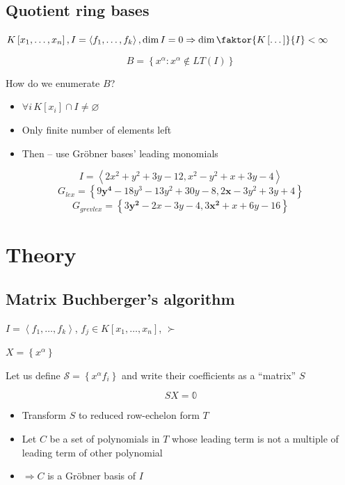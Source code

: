 \subsection{Quotient ring bases}
\begin{frame}
    $K\left[x_1,\dots,x_n\right], I=\left\langle f_1, \dots, f_k\right\rangle, \dim I = 0 \Rightarrow \dim \faktor{K\left[\dots\right]}{I} < \infty$


    $$B=\left\{x^\alpha: x^\alpha\not\in LT\left(I\right)\right\}$$
    
    How do we enumerate $B$?

    \begin{itemize}
        \item $\forall i\, K\left[x_i\right]\cap I \neq \varnothing$
        \item Only finite number of elements left
        \item Then -- use Gr\"obner bases' leading monomials
    \end{itemize}
   
    \pause
    $$I=\left\langle 2x^2+y^2+3y-12, x^2-y^2+x+3y-4\right\rangle$$
    \pause
    $$G_{lex}=\left\{9\mathbf{y^4}-18y^3-13y^2+30y-8, 2\mathbf{x}-3y^2+3y+4\right\}$$
    \pause
    $$G_{grevlex}=\left\{3\mathbf{y^2}-2x-3y-4, 3\mathbf{x^2}+x+6y-16\right\}$$
\end{frame}

\section{Theory}
\subsection{Matrix Buchberger's algorithm}
\begin{frame}
    $I=\left\langle f_1,\dots,f_k\right\rangle$, $f_j\in K\left[x_1,\dots,x_n\right]$, $\succ$

    $X = \left\{x^\alpha\right\}$

    Let us define $\mathcal{S}=\left\{x^\alpha f_i\right\}$ and write their coefficients as a ``matrix'' $S$

    $$S X = \mathbb{0}$$

    \begin{itemize}
        \item Transform $S$ to reduced row-echelon form $T$
        \item Let $C$ be a set of polynomials in $T$ whose leading term is not a multiple of leading term of other polynomial
        \item $\Rightarrow C$ is a Gr\"obner basis of $I$
    \end{itemize}
\end{frame}

